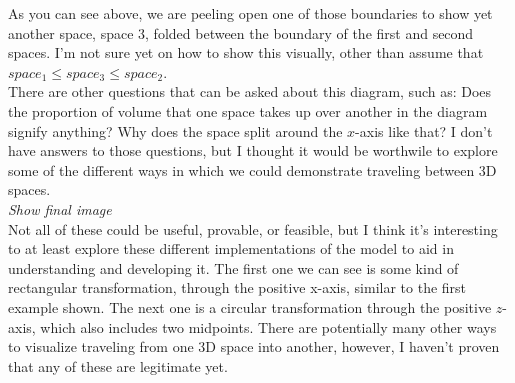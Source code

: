 \documentclass[20pt]{article} %
\begin{document}
As you can see above, we are peeling open one of those boundaries to show yet another space, space $3$, folded between the boundary of the first and second spaces.  I'm not sure yet on how to show this visually, other than assume that $space_1 \leq space_3 \leq space_2$. \\ 

There are other questions that can be asked about this diagram, such as: Does the proportion of volume that one space takes up over another in the diagram signify anything? Why does the space split around the $x$-axis like that? I don't have answers to those questions, but I thought it would be worthwile to explore some of the different ways in which we could demonstrate traveling between 3D spaces. \\ 

\textit{ Show final image} \\ 

Not all of these could be useful, provable, or feasible, but I think it's interesting to at least explore these different implementations of the model to aid in understanding and developing it.  The first one we can see is some kind of rectangular transformation, through the positive x-axis, similar to the first example shown.  The next one is a circular transformation through the positive $z$-axis, which also includes two midpoints.  There are potentially many other ways to visualize traveling from one 3D space into another, however, I haven't proven that any of these are legitimate yet.
\end{document}

